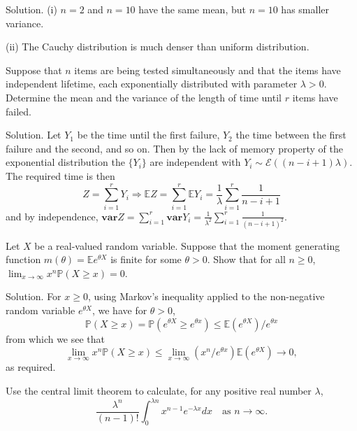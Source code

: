 Solution. (i) $n=2$ and $n=10$ have the same mean, but $n=10$ has smaller variance.

(ii) The Cauchy distribution is much denser than uniform distribution.


\item Suppose that $n$ items are being tested simultaneously and that the items have independent lifetime, each exponentially distributed with parameter $\lambda>0$. Determine the mean and the variance of the length of time until $r$ items have failed.



Solution. Let $Y_1$ be the time until the first failure, $Y_2$ the time between the first failure and the second, and so on. Then by the lack of memory property of the exponential distribution the $\{Y_i\}$ are independent with $Y_i\sim\mathcal{E}((n-i+1)\lambda)$. The required time is then
\begin{equation}
Z = \sum^r_{i=1}Y_i \Rightarrow \mathbb{E}Z = \sum^r_{i=1}\mathbb{E}Y_i	=\frac 1\lambda \sum^r_{i=1} \frac{1}{n-i+1}
\end{equation}
and by independence, $\mathbf{var}Z = \sum^r_{i=1}\mathbf{var}Y_i = \frac 1{\lambda^2}\sum^r_{i=1} \frac{1}{(n-i+1)^2}$.


\item Let $X$ be a real-valued random variable. Suppose that the moment generating function $m(\theta)=\mathbb{E}e^{\theta X}$ is finite for some $\theta>0$. Show that for all $n\geq 0$, $\lim_{x\to\infty}x^n\mathbb{P}(X\geq x)=0$.



Solution. For $x\geq 0$, using Markov's inequality applied to the non-negative random variable $e^{\theta X}$, we have for $\theta>0$,
\begin{equation}
\mathbb{P}(X\geq x) = \mathbb{P}\left(e^{\theta X}\geq e^{\theta x}\right) \leq \mathbb{E}\left(e^{\theta X}\right)/e^{\theta x}
\end{equation}
from which we see that 
\begin{equation}
\lim_{x\to\infty}x^n\mathbb{P}(X\geq x) \leq \lim_{x\to\infty}\left(x^n/e^{\theta x}\right)\mathbb{E}\left(e^{\theta X}\right)\to 0,
\end{equation}
as required.





\item Use the central limit theorem to calculate, for any positive real number $\lambda$,
\begin{equation}
\frac{\lambda^n}{(n-1)!}\int^{\lambda n}_0x^{n-1}e^{-\lambda x}dx \quad \text{as }n\to\infty.
\end{equation} 



